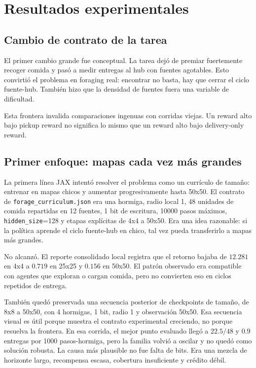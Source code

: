 \documentclass[11pt,a4paper]{article}
\newcommand{\run}[1]{\nolinkurl{#1}}
\begin{document}
\section{Resultados experimentales}

\subsection{Cambio de contrato de la tarea}

El primer cambio grande fue conceptual. La tarea dejó de premiar fuertemente recoger comida y pasó a medir entregas al hub con fuentes agotables. Esto convirtió el problema en foraging real: encontrar no basta, hay que cerrar el ciclo fuente-hub. También hizo que la densidad de fuentes fuera una variable de dificultad.

Esta frontera invalida comparaciones ingenuas con corridas viejas. Un reward alto bajo pickup reward no significa lo mismo que un reward alto bajo delivery-only reward.

\subsection{Primer enfoque: mapas cada vez más grandes}

La primera línea JAX intentó resolver el problema como un currículo de tamaño: entrenar en mapas chicos y aumentar progresivamente hasta 50x50. El contrato de \run{forage_curriculum.json} era una hormiga, radio local 1, 48 unidades de comida repartidas en 12 fuentes, 1 bit de escritura, 10000 pasos máximos, \run{hidden_size}=128 y etapas explícitas de 4x4 a 50x50. Era una idea razonable: si la política aprende el ciclo fuente-hub en chico, tal vez pueda transferirlo a mapas más grandes.

No alcanzó. El reporte consolidado local registra que el retorno bajaba de \(12.281\) en 4x4 a \(0.719\) en 25x25 y \(0.156\) en 50x50. El patrón observado era compatible con agentes que exploran o cargan comida, pero no convierten eso en ciclos repetidos de entrega.

También quedó preservada una secuencia posterior de checkpoints de tamaño, de 8x8 a 50x50, con 4 hormigas, 1 bit, radio 1 y observación 50x50. Esa secuencia visual es útil porque muestra el contrato experimental creciendo, no porque resuelva la frontera. En esa corrida, el mejor punto evaluado llegó a \(22.5/48\) y \(0.9\) entregas por 1000 pasos-hormiga, pero la familia volvió a oscilar y no quedó como solución robusta. La causa más plausible no fue falta de bits. Era una mezcla de horizonte largo, recompensa escasa, cobertura insuficiente y crédito débil.
\end{document}
